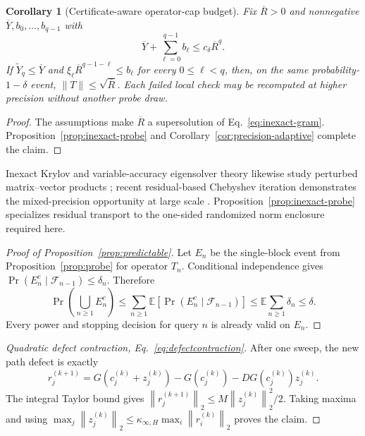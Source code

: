 \documentclass{article}
\newtheorem{corollary}{Corollary}
\newcommand{\norm}[1]{\left\lVert #1\right\rVert_2}
\begin{document}
\begin{corollary}[Certificate-aware operator-cap budget]
\label{cor:operator-cap-budget}
Fix $\overline R>0$ and nonnegative $\overline Y,b_0,\ldots,b_{q-1}$ with
\begin{equation}
 \overline Y+\sum_{\ell=0}^{q-1}b_\ell
 \le c_\delta\overline R^q.
\end{equation}
If $\widetilde Y_q\le\overline Y$ and
$\xi_\ell\overline R^{q-1-\ell}\le b_\ell$ for every $0\le\ell<q$, then, on
the same probability-$1-\delta$ event,
$\|T\|\le\sqrt{\overline R}$.  Each failed local check may be recomputed at
higher precision without another probe draw.
\end{corollary}

\begin{proof}
The assumptions make $\overline R$ a supersolution of
Eq.~\eqref{eq:inexact-gram}.  Proposition~\ref{prop:inexact-probe} and
Corollary~\ref{cor:precision-adaptive} complete the claim.
\end{proof}

Inexact Krylov and variable-accuracy eigensolver theory likewise study
perturbed matrix--vector products
\citep{simoncini2003inexact,simoncini2005variable}; recent residual-based
Chebyshev iteration demonstrates the mixed-precision opportunity at large
scale \citep{kodali2025residual}.  Proposition~\ref{prop:inexact-probe}
specializes residual transport to the one-sided randomized norm enclosure
required here.

\begin{proof}[Proof of Proposition~\ref{prop:predictable}]
Let $E_n$ be the single-block event from Proposition~\ref{prop:probe} for
operator $T_n$.  Conditional independence gives
$\Pr(E_n^c\mid\mathcal F_{n-1})\le\delta_n$.  Therefore
\begin{equation}
 \Pr\!\left(\bigcup_{n\ge1}E_n^c\right)
 \le\sum_{n\ge1}\mathbb E\!\left[
 \Pr(E_n^c\mid\mathcal F_{n-1})\right]
 \le\mathbb E\sum_{n\ge1}\delta_n\le\delta.
\end{equation}
Every power and stopping decision for query $n$ is already valid on $E_n$.
\end{proof}

\begin{proof}[Quadratic defect contraction, Eq.~\eqref{eq:defectcontraction}]
After one sweep, the new path defect is exactly
\begin{equation}
 r^{(k+1)}_j=G(c^{(k)}_j+z^{(k)}_j)-G(c^{(k)}_j)
 -DG(c^{(k)}_j)z^{(k)}_j.
\end{equation}
The integral Taylor bound gives
$\norm{r^{(k+1)}_j}\le M\norm{z^{(k)}_j}^2/2$.  Taking maxima and using
$\max_j\norm{z^{(k)}_j}\le
\kappa_{\infty,H}\max_i\norm{r^{(k)}_i}$ proves the claim.
\end{proof}
\end{document}
